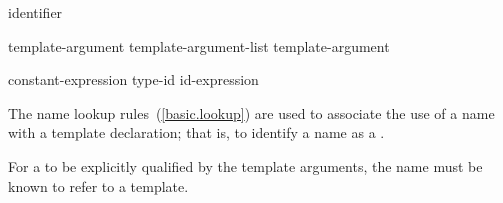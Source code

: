 \begin{bnf}
\br
  identifier
\end{bnf}

\begin{bnf}
\br
  template-argument \opt\br
  template-argument-list \terminal{,} template-argument \opt
\end{bnf}

\begin{bnf}
\br
  constant-expression\br
  type-id\br
  id-expression
\end{bnf}

\begin{note}
The name lookup rules~(\ref{basic.lookup}) are used to associate the use of
a name with a template declaration;
that is, to identify a name as a
.
\end{note}

\pnum
For a
to be explicitly qualified by the template arguments,
the name must be known to refer to a template.

